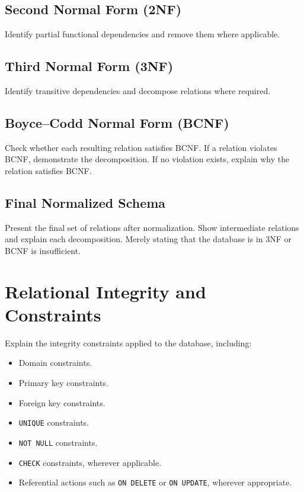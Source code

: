 \documentclass[12pt,a4paper]{report}
\begin{document}
\section{Second Normal Form (2NF)}
Identify partial functional dependencies and remove them where applicable.

\section{Third Normal Form (3NF)}
Identify transitive dependencies and decompose relations where required.

\section{Boyce--Codd Normal Form (BCNF)}
Check whether each resulting relation satisfies BCNF. If a relation violates BCNF, demonstrate the decomposition. If no violation exists, explain why the relation satisfies BCNF.

\section{Final Normalized Schema}
Present the final set of relations after normalization. Show intermediate relations and explain each decomposition. Merely stating that the database is in 3NF or BCNF is insufficient.

\chapter{Relational Integrity and Constraints}

Explain the integrity constraints applied to the database, including:
\begin{itemize}
    \item Domain constraints.
    \item Primary key constraints.
    \item Foreign key constraints.
    \item \texttt{UNIQUE} constraints.
    \item \texttt{NOT NULL} constraints.
    \item \texttt{CHECK} constraints, wherever applicable.
    \item Referential actions such as \texttt{ON DELETE} or \texttt{ON UPDATE}, wherever appropriate.
\end{itemize}
\end{document}
